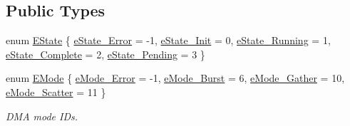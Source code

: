 \subsection*{Public Types}
\begin{DoxyCompactItemize}
\item 
enum \mbox{\hyperlink{a01809_a64e694fd40d32179e429eb7934a64842}{E\+State}} \{ \newline
\mbox{\hyperlink{a01809_a64e694fd40d32179e429eb7934a64842a69a920ab4dfa07772db187753b2792c3}{e\+State\+\_\+\+Error}} = -\/1, 
\mbox{\hyperlink{a01809_a64e694fd40d32179e429eb7934a64842a30c329d408f76e22e599bd595d5a05ee}{e\+State\+\_\+\+Init}} = 0, 
\mbox{\hyperlink{a01809_a64e694fd40d32179e429eb7934a64842ab6dd06647cf9721e5b0b737952c3bb95}{e\+State\+\_\+\+Running}} = 1, 
\mbox{\hyperlink{a01809_a64e694fd40d32179e429eb7934a64842a0bc0574a45ed068800b0c7478084ae59}{e\+State\+\_\+\+Complete}} = 2, 
\newline
\mbox{\hyperlink{a01809_a64e694fd40d32179e429eb7934a64842ac7d67500e8f2bb9c260956db33549d4f}{e\+State\+\_\+\+Pending}} = 3
 \}
\item 
enum \mbox{\hyperlink{a01809_af8d0f19f2896dd6dbd126b919b24e39b}{E\+Mode}} \{ \mbox{\hyperlink{a01809_af8d0f19f2896dd6dbd126b919b24e39ba258186a22f0d1691d0cb369c5af278a8}{e\+Mode\+\_\+\+Error}} = -\/1, 
\mbox{\hyperlink{a01809_af8d0f19f2896dd6dbd126b919b24e39ba253c129077dc004dd83cca8931e69eb9}{e\+Mode\+\_\+\+Burst}} = 6, 
\mbox{\hyperlink{a01809_af8d0f19f2896dd6dbd126b919b24e39badec2b76540ba9a168b7a049acb50654d}{e\+Mode\+\_\+\+Gather}} = 10, 
\mbox{\hyperlink{a01809_af8d0f19f2896dd6dbd126b919b24e39bac8f3cbed92bc7d135e306cc154ac2ae6}{e\+Mode\+\_\+\+Scatter}} = 11
 \}
\begin{DoxyCompactList}\small\item\em D\+MA mode I\+Ds. \end{DoxyCompactList}\end{DoxyCompactItemize}

